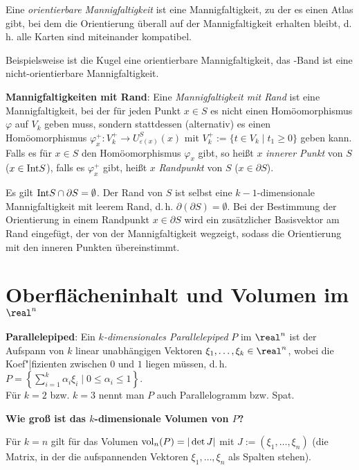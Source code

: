Eine \emph{orientierbare Mannigfaltigkeit} ist eine Mannigfaltigkeit, zu der
es einen Atlas gibt, bei dem die Orientierung überall auf der Mannigfaltigkeit
erhalten bleibt, d.\,h. alle Karten sind miteinander kompatibel.

Beispielsweise ist die Kugel eine orientierbare Mannigfaltigkeit,
das -Band ist eine nicht-orientierbare Mannigfaltigkeit.

\linie

\textbf{Mannigfaltigkeiten mit Rand}:
Eine \emph{Mannigfaltigkeit mit Rand} ist eine Mannigfaltigkeit, bei der für
jeden Punkt $x \in S$ es nicht einen Homöomorphismus
$\varphi$ auf $V_k$ geben muss, sondern stattdessen (alternativ) es einen
Homöomorphismus
$\varphi_x^+\colon V_k^+ \rightarrow U_{\varepsilon(x)}^S(x)$ mit
$V_k^+ := \{t \in V_k \;|\; t_1 \ge 0\}$ geben kann.
Falls es für $x \in S$ den Homöomorphismus $\varphi_x$ gibt, so heißt
$x$ \emph{innerer Punkt} von $S$ ($x \in {\operatorname{Int}} S$), falls es $\varphi_x^+$ gibt,
heißt $x$ \emph{Randpunkt} von $S$ ($x \in \partial S$).

Es gilt ${\operatorname{Int}} S \cap \partial S = \emptyset$.
Der Rand von $S$ ist selbst eine $k - 1$-dimensionale Mannigfaltigkeit
mit leerem Rand, d.\,h. $\partial (\partial S) = \emptyset$.
Bei der Bestimmung der Orientierung in einem Randpunkt $x \in \partial S$ wird
ein zusätzlicher Basisvektor am Rand eingefügt, der von der Mannigfaltigkeit
wegzeigt, sodass die Orientierung mit den inneren Punkten übereinstimmt.

\pagebreak

\section{%
    \texorpdfstring{Oberflächeninhalt und Volumen im $\real^n$}%
    {Oberflächeninhalt und Volumen im ℝⁿ}%
}

\textbf{Parallelepiped}:
Ein \emph{$k$-dimensionales Parallelepiped} $P$ im $\real^n$ ist der Aufspann
von $k$ linear unabhängigen Vektoren $\xi_1, \dotsc, \xi_k \in \real^n$,
wobei die Koef"|fizienten zwischen $0$ und $1$ liegen müssen, d.\,h.
$P = \left\{\sum_{i=1}^k \alpha_i \xi_i \;|\; 0 \le \alpha_i \le 1\right\}$. \\
Für $k = 2$ bzw. $k = 3$ nennt man $P$ auch Parallelogramm bzw. Spat.

\linie

\textbf{Wie groß ist das $k$-dimensionale Volumen von $P$?}

Für $k = n$ gilt für das Volumen ${\operatorname{vol}}_n(P) = |\det J|$ mit
$J := (\xi_1, \dotsc, \xi_n)$
(die Matrix, in der die aufspannenden Vektoren $\xi_1, \dotsc, \xi_n$ als
Spalten stehen).

